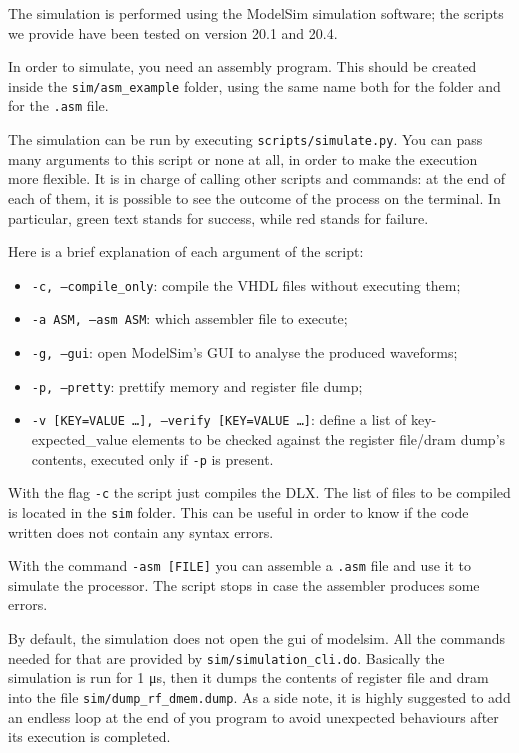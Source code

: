 The simulation is performed using the ModelSim simulation software; the scripts we provide have been tested on version 20.1 and 20.4.

In order to simulate, you need an assembly program.
This should be created inside the \texttt{sim/asm\_example} folder, using the same name both for the folder and for the \texttt{.asm} file.

The simulation can be run by executing \texttt{scripts/simulate.py}. 
You can pass many arguments to this script or none at all, in order to make the execution more flexible. 
It is in charge of calling other scripts and commands: at the end of each of them, it is possible to see the outcome of the process on the terminal. 
In particular, green text stands for success, while red stands for failure. 

Here is a brief explanation of each argument of the script:
\begin{itemize}
\item \texttt{-c, --compile\_only}: compile the VHDL files without executing them;
\item \texttt{-a ASM, --asm ASM}: which assembler file to execute;
\item \texttt{-g, --gui}: open ModelSim's GUI to analyse the produced waveforms;
\item \texttt{-p, --pretty}: prettify memory and register file dump;
\item \texttt{-v [KEY=VALUE \dots], --verify [KEY=VALUE \dots]}: define a list of key-expected\_value elements to be checked against the register file/dram dump's contents, executed only if \texttt{-p} is present.
\end{itemize}

With the flag \texttt{-c} the script just compiles the DLX. 
The list of files to be compiled is located in the \texttt{sim} folder. 
This can be useful in order to know if the code written does not contain any syntax errors.

With the command \texttt{-asm [FILE]} you can assemble a \texttt{.asm} file and use it to simulate the processor. 
The script stops in case the assembler produces some errors.

By default, the simulation does not open the gui of modelsim. 
All the commands needed for that are provided by \texttt{sim/simulation\_cli.do}.
Basically the simulation is run for 1 \si{\micro\second}, then it dumps the contents of register file and dram into the file \texttt{sim/dump\_rf\_dmem.dump}.
As a side note, it is highly suggested to add an endless loop at the end of you program to avoid unexpected behaviours after its execution is completed.

